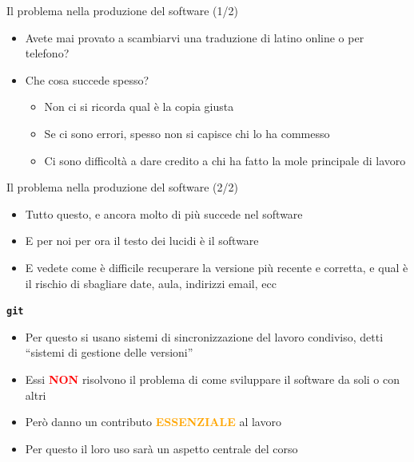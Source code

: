 \documentclass{beamer}
\newcommand{\git}{\texttt{\textbf{git}}\xspace}
\begin{document}
\begin{frame}
{\centerline{Il problema nella produzione del software (1/2)}}
\begin{itemize}
    \item Avete mai provato a scambiarvi una traduzione di latino online o per telefono?
    \item Che cosa succede spesso?
    \begin{itemize}
    \item Non ci si ricorda qual \`{e} la copia giusta
    \item Se ci sono errori, spesso non si capisce chi lo ha commesso
    \item Ci sono difficolt\`{a} a dare credito a chi ha fatto la mole principale di lavoro
\end{itemize} 

\end{itemize} 
\end{frame}

\begin{frame}
{\centerline{Il problema nella produzione del software (2/2)}}
\begin{itemize}
    \item Tutto questo, e ancora molto di pi\`{u} succede nel software
    \item E per noi per ora il testo dei lucidi \`{e} il software
    \item E vedete come \`{e} difficile recuperare la versione pi\`{u} recente e corretta, e qual \`{e} il rischio di sbagliare date, aula, indirizzi email, ecc
\end{itemize} 
\end{frame}

\begin{frame}
{\centerline{\git}}
\begin{itemize}
    \item Per questo si usano sistemi di sincronizzazione del lavoro condiviso, detti ``sistemi di gestione delle versioni''
    \item Essi \textcolor{red}{\textbf{NON}} risolvono il problema di come sviluppare il software da soli o con altri
    \item Per\`{o} danno un contributo \textcolor{orange}{\textbf{ESSENZIALE}} al lavoro
    \item Per questo il loro uso sar\`{a} un aspetto centrale del corso
\end{itemize} 
\end{frame}
\end{document}
